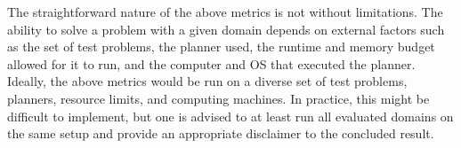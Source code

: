 \documentclass[letterpaper]{article} %
\newcommand{\realm}{{\ensuremath{M^*}}\xspace}
\newcommand{\commentout}[1]{ }
\newif\ifaddcomments
\newcommand{\roni}[1]{\ifaddcomments{\textcolor{red}{[Roni: #1]}}\fi}
\newcommand{\mauro}[1]{\ifaddcomments{\textcolor{green}{[Mauro: #1]}}\fi}
\newcommand{\gregor}[1]{\ifaddcomments{\textcolor{orange}{[Gregor: #1]}}\fi}
\newcommand{\cm}[1]{\ifaddcomments{\textcolor{olive}{[Christian: #1]}}\fi}
\begin{document}
The straightforward nature of the above metrics is not without limitations. The ability to solve a problem with a given domain depends on external factors such as the set of test problems, the planner used, the runtime and memory budget allowed for it to run, and the computer and OS that executed the planner. 
Ideally, the above metrics would be run on a diverse set of test problems, planners, resource limits, and computing machines. In practice, this might be difficult to implement, but one is advised to at least run all evaluated domains on the same setup and provide an appropriate disclaimer to the concluded result. 


\end{document}
